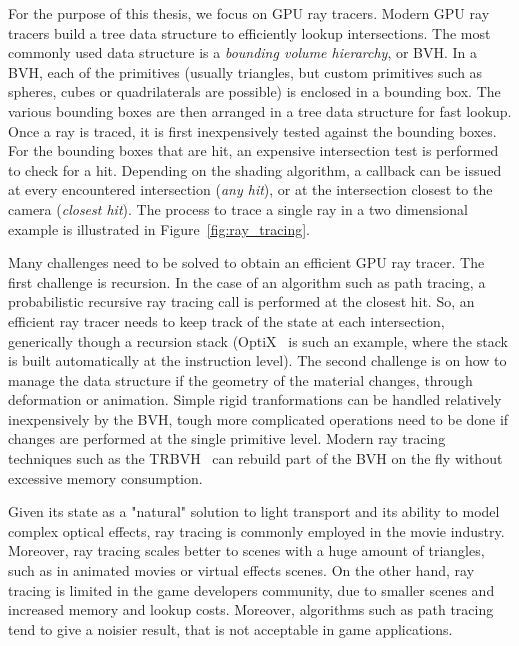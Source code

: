For the purpose of this thesis, we focus on GPU ray tracers. Modern GPU ray tracers build a tree data structure to efficiently lookup intersections. The most commonly used data structure is a \emph{bounding volume hierarchy}, or BVH. In a BVH, each of the primitives (usually triangles, but custom primitives such as spheres, cubes or quadrilaterals are possible) is enclosed in a bounding box. The various bounding boxes are then arranged in a tree data structure for fast lookup. Once a ray is traced, it is first inexpensively tested against the bounding boxes. For the bounding boxes that are hit, an expensive intersection test is performed to check for a hit. Depending on the shading algorithm, a callback can be issued at every encountered intersection (\emph{any hit}), or at the intersection closest to the camera (\emph{closest hit}). The process to trace a single ray in a two dimensional example is illustrated in Figure~\ref{fig:ray_tracing}. 

Many challenges need to be solved to obtain an efficient GPU ray tracer. The first challenge is recursion. In the case of an algorithm such as path tracing, a probabilistic recursive ray tracing call is performed at the closest hit. So, an efficient ray tracer needs to keep track of the state at each intersection, generically though a recursion stack (OptiX~\cite{Parker2010} is such an example, where the stack is built automatically at the instruction level). The second challenge is on how to manage the data structure if the geometry of the material changes, through deformation or animation. Simple rigid tranformations can be handled relatively inexpensively by the BVH, tough more complicated operations need to be done if  changes are performed at the single primitive level. Modern ray tracing techniques such as the TRBVH~\cite{Karras2013} can rebuild part of the BVH on the fly without excessive memory consumption. 

Given its state as a "natural" solution to light transport and its ability to model complex optical effects, ray tracing is commonly employed in the movie industry. Moreover, ray tracing scales better to scenes with a huge amount of triangles, such as in animated movies or virtual effects scenes. On the other hand, ray tracing is limited in the game developers community, due to smaller scenes and increased memory and lookup costs. Moreover, algorithms such as path tracing tend to give a noisier result, that is not acceptable in game applications. 


